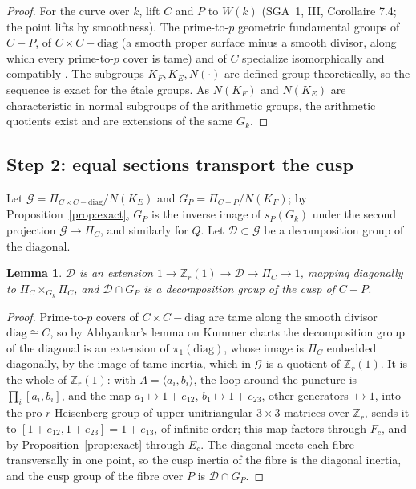 \documentclass[11pt]{amsart}
\newtheorem{lemma}[thm]{Lemma}
\theoremstyle{remark}
\newcommand{\Z}{\mathbb Z}
\begin{document}
\begin{proof}
For the curve over $k$, lift $C$ and $P$ to $W(k)$ (SGA~1, III, Corollaire 7.4; the point lifts by smoothness). The prime-to-$p$ geometric fundamental groups of $C-P$, of $C\times C-\mathrm{diag}$ (a smooth proper surface minus a smooth divisor, along which every prime-to-$p$ cover is tame) and of $C$ specialize isomorphically and compatibly \cite[XIII, Corollaire 2.9, \S2.10, Lemme 2.11]{SGA1}. The subgroups $K_F,K_E,N(\cdot)$ are defined group-theoretically, so the sequence is exact for the \'etale groups. As $N(K_F)$ and $N(K_E)$ are characteristic in normal subgroups of the arithmetic groups, the arithmetic quotients exist and are extensions of the same $G_k$.
\end{proof}

\subsection{Step 2: equal sections transport the cusp}
Let $\mathcal G=\Pi_{C\times C-\mathrm{diag}}/N(K_E)$ and $G_P=\Pi_{C-P}/N(K_F)$; by Proposition~\ref{prop:exact}, $G_P$ is the inverse image of $s_P(G_k)$ under the second projection $\mathcal G\to\Pi_C$, and similarly for $Q$. Let $\mathcal D\subset\mathcal G$ be a decomposition group of the diagonal.

\begin{lemma}\label{lem:diag}
$\mathcal D$ is an extension $1\to\Z_r(1)\to\mathcal D\to\Pi_C\to1$, mapping diagonally to $\Pi_C\times_{G_k}\Pi_C$, and $\mathcal D\cap G_P$ is a decomposition group of the cusp of $C-P$.
\end{lemma}

\begin{proof}
Prime-to-$p$ covers of $C\times C-\mathrm{diag}$ are tame along the smooth divisor $\mathrm{diag}\cong C$, so by Abhyankar's lemma on Kummer charts \cite[XIII, Proposition 5.2]{SGA1} the decomposition group of the diagonal is an extension of $\pi_1(\mathrm{diag})$, whose image is $\Pi_C$ embedded diagonally, by the image of tame inertia, which in $\mathcal G$ is a quotient of $\Z_r(1)$. It is the whole of $\Z_r(1)$: with $\Lambda=\langle a_i,b_i\rangle$, the loop around the puncture is $\prod_i[a_i,b_i]$, and the map $a_1\mapsto1+e_{12}$, $b_1\mapsto1+e_{23}$, other generators $\mapsto1$, into the pro-$r$ Heisenberg group of upper unitriangular $3\times3$ matrices over $\Z_r$, sends it to $[1+e_{12},1+e_{23}]=1+e_{13}$, of infinite order; this map factors through $F_c$, and by Proposition~\ref{prop:exact} through $E_c$. The diagonal meets each fibre transversally in one point, so the cusp inertia of the fibre is the diagonal inertia, and the cusp group of the fibre over $P$ is $\mathcal D\cap G_P$.
\end{proof}
\end{document}
